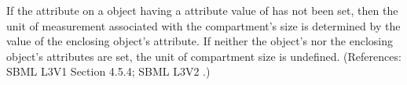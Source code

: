 If the attribute  on a \Compartment object having a
 attribute value of  has not been set, then
the unit of measurement associated with the compartment's size is
determined by the value of the enclosing \Model object's 
attribute.  If neither the \Compartment object's  nor the
enclosing \Model object's  attributes are set, the unit of
compartment size is undefined.  (References: SBML L3V1 Section 4.5.4; SBML L3V2
.)
